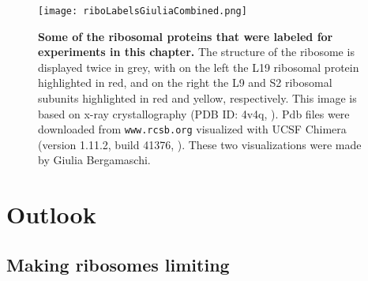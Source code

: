 \begin{figure}
    \centering
    \texttt{[image: riboLabelsGiuliaCombined.png]}
    \caption{ 
        \textbf{Some of the ribosomal proteins that were labeled for experiments in this chapter.}
        The structure of the ribosome is displayed twice in grey, with on the left the L19 ribosomal protein highlighted in red, and on the right the L9 and S2 ribosomal subunits highlighted in red and yellow, respectively.
        This image is based on x-ray crystallography (PDB ID: 4v4q, \cite{Schuwirth2005}). Pdb files were downloaded from \texttt{www.rcsb.org} \cite{Berman2000} 
        visualized with UCSF Chimera (version 1.11.2, build 41376, \cite{pettersen2004}). These two visualizations were made by Giulia Bergamaschi.
    }
    \label{fig:ribo:labelsPicGiulia}
\end{figure}

\section{Outlook}

\subsection{Making ribosomes limiting}



